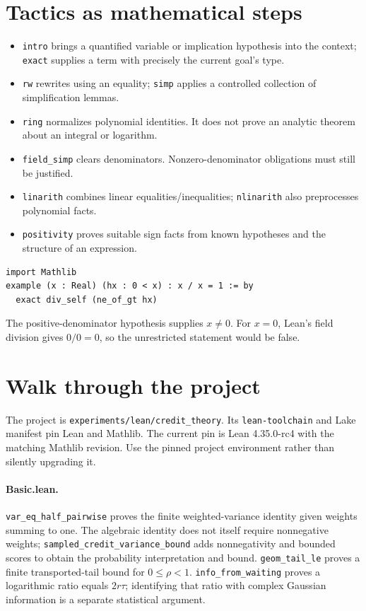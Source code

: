 \documentclass[11pt]{article}
\begin{document}
\section{Tactics as mathematical steps}
\begin{itemize}
\item \texttt{intro} brings a quantified variable or implication hypothesis into the context; \texttt{exact} supplies a term with precisely the current goal's type.
\item \texttt{rw} rewrites using an equality; \texttt{simp} applies a controlled collection of simplification lemmas.
\item \texttt{ring} normalizes polynomial identities. It does not prove an analytic theorem about an integral or logarithm.
\item \texttt{field\_\allowbreak{}simp} clears denominators. Nonzero-denominator obligations must still be justified.
\item \texttt{linarith} combines linear equalities/inequalities; \texttt{nlinarith} also preprocesses polynomial facts.
\item \texttt{positivity} proves suitable sign facts from known hypotheses and the structure of an expression.
\end{itemize}
\begin{example}
\begin{verbatim}
import Mathlib
example (x : Real) (hx : 0 < x) : x / x = 1 := by
  exact div_self (ne_of_gt hx)
\end{verbatim}
The positive-denominator hypothesis supplies $x\ne0$. For $x=0$, Lean's field division gives $0/0=0$, so the unrestricted statement would be false.
\end{example}
\section{Walk through the project}
The project is \texttt{experiments/lean/credit\_\allowbreak{}theory}. Its \texttt{lean-toolchain} and Lake manifest pin Lean and Mathlib. The current pin is Lean 4.35.0-rc4 with the matching Mathlib revision. Use the pinned project environment rather than silently upgrading it.
\paragraph{Basic.lean.} \texttt{var\_\allowbreak{}eq\_\allowbreak{}half\_\allowbreak{}pairwise} proves the finite weighted-variance identity given weights summing to one. The algebraic identity does not itself require nonnegative weights; \texttt{sampled\_\allowbreak{}credit\_\allowbreak{}variance\_\allowbreak{}bound} adds nonnegativity and bounded scores to obtain the probability interpretation and bound. \texttt{geom\_\allowbreak{}tail\_\allowbreak{}le} proves a finite transported-tail bound for $0\le\rho<1$. \texttt{info\_\allowbreak{}from\_\allowbreak{}waiting} proves a logarithmic ratio equals $2r\tau$; identifying that ratio with complex Gaussian information is a separate statistical argument.
\end{document}
